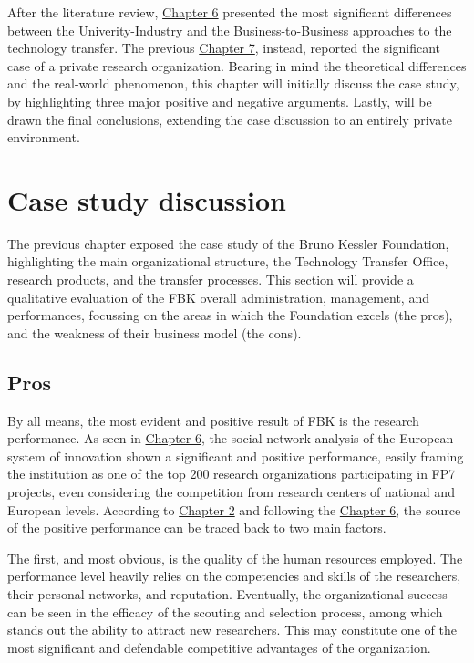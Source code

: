 

\label{Chapter8} %

After the literature review, \hyperref[Chapter6]{Chapter 6} presented the most significant differences between the Univerity-Industry and the Business-to-Business approaches to the technology transfer. The previous \hyperref[Chapter7]{Chapter 7}, instead, reported the significant case of a private research organization. Bearing in mind the theoretical differences and the real-world phenomenon, this chapter will initially discuss the case study, by highlighting three major positive and negative arguments. Lastly, will be drawn the final conclusions, extending the case discussion to an entirely private environment.

\section{Case study discussion}

The previous chapter exposed the case study of the Bruno Kessler Foundation, highlighting the main organizational structure, the Technology Transfer Office, research products, and the transfer processes. This section will provide a qualitative evaluation of the FBK overall administration, management, and performances, focussing on the areas in which the Foundation excels (the pros), and the weakness of their business model (the cons).

\subsection{Pros}

By all means, the most evident and positive result of FBK is the research performance. As seen in \hyperref[Chapter6]{Chapter 6}, the social network analysis of the European system of innovation shown a significant and positive performance, easily framing the institution as one of the top 200 research organizations participating in FP7 projects, even considering the competition from research centers of national and European levels. According to \hyperref[Chapter2]{Chapter 2} and following the \hyperref[Chapter6]{Chapter 6}, the source of the positive performance can be traced back to two main factors.

The first, and most obvious, is the quality of the human resources employed. The performance level heavily relies on the competencies and skills of the researchers, their personal networks, and reputation. Eventually, the organizational success can be seen in the efficacy of the scouting and selection process, among which stands out the ability to attract new researchers. This may constitute one of the most significant and defendable competitive advantages of the organization. 

